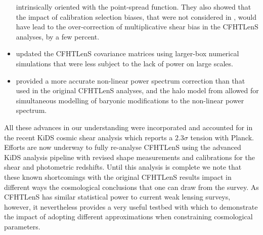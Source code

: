 \begin{itemize}
{intrinsically oriented with the point-spread function.  They also showed that
the impact of calibration selection biases, that were not considered in
\citet{CFHTLenS-shapes}, would have lead to the over-correction of
multiplicative shear bias in the CFHTLenS analyses, by a few percent.}
%
\item{\citet{joudaki/etal:2016} updated the CFHTLenS covariance matrices using
larger-box numerical simulations that were less subject to the lack of power on
large scales.}
\item{\cite{2012ApJ...761..152T} provided a more accurate non-linear power
spectrum correction than that used in the original CFHTLenS analyses, and the
halo model from \cite{2015MNRAS.454.1958M} allowed for simultaneous modelling
of baryonic modifications to the non-linear power spectrum.} 
%
\end{itemize}
%
All these advances in our understanding were incorporated and accounted for in
the recent KiDS cosmic shear analysis \citep{KiDS-450} which reports a $2.3
\sigma$ tension with Planck.  Efforts are now underway to fully re-analyse
CFHTLenS using the advanced KiDS analysis pipeline with revised shape
measurements and calibrations for the shear and photometric redshifts.  Until
this analysis is complete we note that these known shortcomings with the
original CFHTLenS results impact in different ways the cosmological conclusions
that one can draw from the survey.  As CFHTLenS has similar statistical power
to current weak lensing surveys, however, it nevertheless provides a very
useful testbed with which to demonstrate the impact of adopting different
approximations when constraining cosmological parameters.



